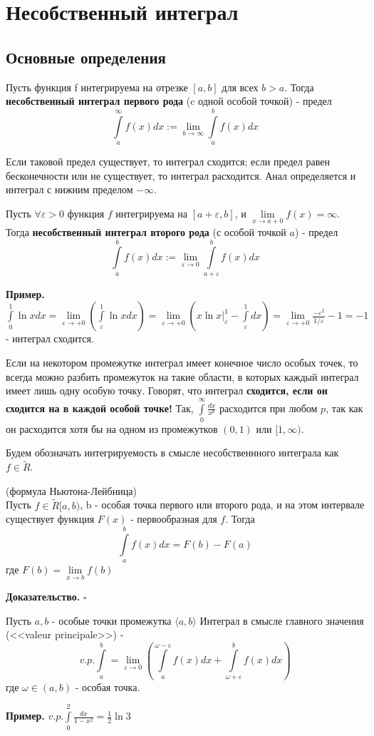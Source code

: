 \chapter{Несобственный интеграл}
\section{Основные определения}
\begin{defin}
Пусть функция f интегрируема на отрезке $[a,b]$ для всех  $b>a$. 
Тогда \textbf{несобственный интеграл первого рода} (c одной особой точкой)
- предел 
$$\int\limits_{a}^{\infty}f(x)dx:=\lim\limits_{b\to\infty}\int\limits_{a}^{b}
f(x)dx$$
\end{defin}
Если таковой предел существует, то интеграл сходится; если предел равен 
бесконечности или не существует, то интеграл расходится. Анал
определяется и интеграл с нижним пределом $-\infty$.
\begin{defin}
    Пусть $\forall \varepsilon>0$ функция $f$ интегрируема на $[a+\varepsilon,
    b]$, и $\lim\limits_{x \to a+0} f(x)=\infty$. Тогда \textbf{несобственный
    интеграл второго рода} (с особой точкой $a$) - предел 
    $$\int\limits_{a}^{b} f(x)dx:=\lim\limits_{\varepsilon \to 0} 
    \int\limits_{a+\varepsilon}^{b} f(x)dx$$
\end{defin}

\textbf{Пример.} $\int\limits_{0}^{1} \ln xdx=\lim\limits_{\varepsilon \to 
+0} \left( \int\limits_{\varepsilon}^{1}\ln xdx\right)=
\lim\limits_{\varepsilon \to +0}\left( x\ln x\big|_\varepsilon^1-
\int\limits_{\varepsilon}^1dx  \right)=\lim\limits_{\varepsilon \to +0}
\frac{-\varepsilon^2}{1 /\varepsilon}-1=-1$ - интеграл сходится.

Если на некотором промежутке интеграл имеет конечное число особых точек, то 
всегда можно разбить промежуток на такие области, в которых каждый интеграл 
имеет лишь одну особую точку. Говорят, что интеграл \textbf{сходится, 
если он сходится на в каждой особой точке!} Так,
$\int\limits_{0}^{\infty} \frac{dx}{x^p}$ расходится при любом $p$, так 
как он расходится хотя бы на одном из промежутков  $(0,1)$ или
$[1,\infty)$.

Будем обозначать интегрируемость в смысле несобственнного интеграла как
$f\in \tilde R$.
\begin{theor}
    (формула Ньютона-Лейбница)\\
    Пусть $f\in \tilde R[a,b)$, b - особая точка первого или второго рода, 
    и на этом интервале существует функция $F(x)$ - первообразная для  $f$. 
    Тогда
     $$\int\limits_{a}^{b}f(x)dx=F(b)-F(a)$$ 
     где $F(b)=\lim\limits_{x \to b}f(b)$
\end{theor}
\textbf{Доказательство.}  
$\square$ 
\begin{defin}
Пусть $a,b$ - особые точки промежутка  $\langle a,b\rangle$
Интеграл в смысле главного значения (<<valeur principale>>) - 
$$v.p. \int\limits_{a}^{b}=\lim\limits_{\varepsilon \to 0}\left(
\int\limits_{a}^{\omega-\varepsilon}f(x)dx+\int\limits_{\omega+\varepsilon}^{b}
f(x)dx\right)$$
где $\omega\in (a,b)$ - особая точка.
\end{defin}
\textbf{Пример.} $v.p. \int\limits_{0}^{2}\frac{dx}{1-x^2}=\frac{1}{2}\ln3$

